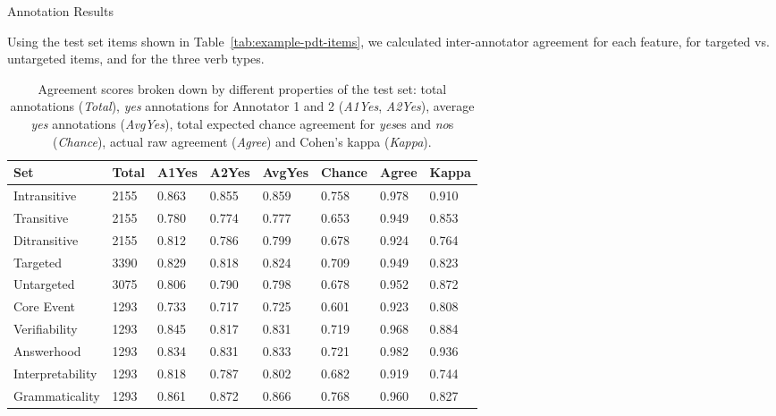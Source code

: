 \documentclass[final,t]{beamer}
\begin{document}
\begin{frame}{}
\begin{columns}[t]
\begin{column}{.33\linewidth}
\begin{block}{Annotation Results}
\begin{center}
\begin{minipage}{.85\textwidth}
\vspace{1em}
Using the test set items shown in Table~\ref{tab:example-pdt-items}, we calculated inter-annotator agreement for each feature, for targeted vs. untargeted items, and for the three verb types.
\vspace{1em}
\begin{table}[htb!]
\begin{center}
\begin{tabular}{|l|l|l|l|l||l|l||l|}
\hline
Set	& Total	& A1Yes & A2Yes & AvgYes & Chance & Agree & Kappa \\
\hline
\hline
Intransitive & 2155 & 0.863 & 0.855 & 0.859 & 0.758 & 0.978 & 0.910 \\
\hline
Transitive & 2155 & 0.780 & 0.774 & 0.777 & 0.653 & 0.949 & 0.853 \\
\hline
Ditransitive & 2155 & 0.812 & 0.786 & 0.799 & 0.678 & 0.924 & 0.764 \\ 
\hline
\hline
Targeted & 3390 & 0.829 & 0.818 & 0.824 & 0.709 & 0.949 & 0.823 \\
\hline
Untargeted & 3075 & 0.806 & 0.790 & 0.798 & 0.678 & 0.952 & 0.872 \\
\hline
\hline
Core Event & 1293 & 0.733 & 0.717 & 0.725 & 0.601 & 0.923 & 0.808 \\
\hline
Verifiability & 1293 & 0.845 & 0.817 & 0.831 & 0.719 & 0.968 & 0.884 \\
\hline
Answerhood & 1293 & 0.834 & 0.831 & 0.833 & 0.721 & 0.982 & 0.936 \\
\hline
Interpretability & 1293 & 0.818 & 0.787 & 0.802 & 0.682 & 0.919 & 0.744 \\
\hline
Grammaticality & 1293 & 0.861 & 0.872 & 0.866 & 0.768 & 0.960 & 0.827 \\
\hline
\end{tabular}
\caption{\label{tab:agreement} Agreement scores broken down by different properties of the test set: total annotations (\textit{Total}), \textit{yes} annotations for Annotator 1 and 2 (\textit{A1Yes}, \textit{A2Yes}), average \textit{yes} annotations (\textit{AvgYes}), total expected chance agreement for \textit{yes}es and \textit{no}s (\textit{Chance}), actual raw agreement (\textit{Agree}) and Cohen's kappa (\textit{Kappa}).}
\end{center}
\end{table}
\vspace{1em}


\end{minipage}
\end{center}
\end{block}
\end{column}
\end{columns}
\end{frame}
\end{document}
